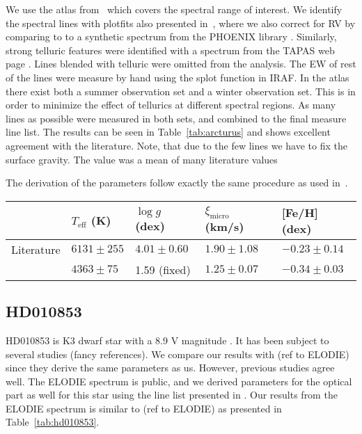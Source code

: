 \documentclass{aa}
\begin{document}
We use the atlas from~\cite{Hinkle2003} which covers the spectral range of
interest. We identify the spectral lines with plot\textunderscore{}fits also
presented in~\cite{Andreasen2016}, where we also correct for RV by comparing to
to a synthetic spectrum from the PHOENIX library \citep{Husser2013}. Similarly,
strong telluric features were identified with a spectrum from the TAPAS web page
\citep{Bertaux2014}. Lines blended with telluric were omitted from the analysis.
The EW of rest of the lines were measure by hand using the splot function in
IRAF. In the atlas there exist both a summer observation set and a winter
observation set. This is in order to minimize the effect of tellurics at
different spectral regions. As many lines as possible were measured in both
sets, and combined to the final measure line list. The results can be seen in
Table~\ref{tab:arcturus} and shows excellent agreement with the literature.
Note, that due to the few  lines we have to fix the surface gravity.
The value was a mean of many literature values

The derivation of the parameters follow exactly the same procedure as used
in~\cite{Andreasen2016}.

\begin{table*}[htb!]
    \caption{The derived parameters for Arcturus with
    fixed surface gravity cut after 3$\sigma$ outlier removal. linelist: arcturus2Cut4ol.moog}
    \label{tab:arcturus}
    \centering
    \begin{tabular}{lllll}
      \hline\hline
                     & $T_\mathrm{eff}$ (K) &  $\log g$ (dex)  &   $\xi_\mathrm{micro}$ (km/s)   & [Fe/H] (dex)      \\
      \hline
        Literature   & $6131 \pm 255$       &  $4.01 \pm 0.60$ &    $1.90 \pm 1.08$              & $-0.23 \pm 0.14$ \\
      \hline
                     & $4363 \pm 75$        &   1.59 (fixed)   &    $1.25 \pm 0.07$              & $-0.34 \pm 0.03$ \\
      \hline
    \end{tabular}
\end{table*}



\subsection{HD010853}
\label{sub:HD010853}
HD010853 is K3 dwarf star with a 8.9 V magnitude \citep{Koen2010}. It has been
subject to several studies (fancy references). We compare our results with (ref
to ELODIE) since they derive the same parameters as us. However, previous
studies agree well. The ELODIE spectrum is public, and we derived parameters for
the optical part as well for this star using the line list presented in
\citet{Sousa2008a}. Our results from the ELODIE spectrum is similar to (ref to
ELODIE) as presented in Table~\ref{tab:hd010853}.
\end{document}
